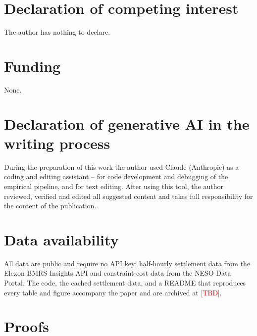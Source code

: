 \documentclass[review,3p,times]{elsarticle}
\newcommand{\TBD}{\textcolor{red}{[TBD]}}
\theoremstyle{plain}
\theoremstyle{definition}
\begin{document}
\section*{Declaration of competing interest}
The author has nothing to declare.

\section*{Funding}
None.

\section*{Declaration of generative AI in the writing process}
During the preparation of this work the author used Claude (Anthropic) as a coding
and editing assistant -- for code development and debugging of the empirical
pipeline, and for text editing. After using this tool, the author reviewed,
verified and edited all suggested content and takes full responsibility for the
content of the publication.

\section*{Data availability}
All data are public and require no API key: half-hourly settlement data from the
Elexon BMRS Insights API and constraint-cost data from the NESO Data Portal. The
code, the cached settlement data, and a README that reproduces every table and
figure accompany the paper and are archived at \TBD.

\appendix

\section{Proofs}\label{app:proofs}
\end{document}
